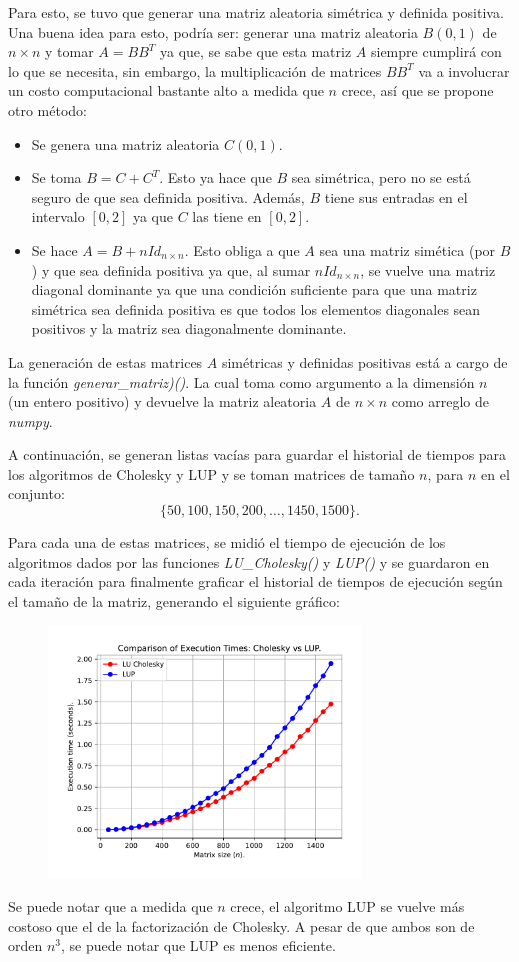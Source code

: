 Para esto, se tuvo que generar una matriz aleatoria simétrica y definida positiva. Una buena idea para esto, podría ser: generar una matriz aleatoria $B(0,1)$ de $n\times n$ y tomar $A = BB^{T}$ ya que, se sabe que esta matriz $A$ siempre cumplirá con lo que se necesita, sin embargo, la multiplicación de matrices $BB^{T}$ va a  involucrar un costo computacional bastante alto a medida que $n$ crece, así que se propone otro método:
\begin{itemize}
	\item Se genera una matriz aleatoria $C(0,1)$.
	\item Se toma $B = C+C^T$. Esto ya hace que $B$ sea simétrica, pero no se está seguro de que sea definida positiva. Además, $B$ tiene sus entradas en el intervalo $[0,2]$ ya que $C$ las tiene en $[0,2]$.
	\item Se hace $A = B + nId_{n\times n}$. Esto obliga a que $A$ sea una matriz simética (por $B$) y que sea definida positiva ya que, al sumar $nId_{n\times n}$, se vuelve una matriz diagonal dominante ya que una condición suficiente para que una matriz simétrica sea definida positiva es que todos los elementos diagonales sean positivos y la matriz sea diagonalmente dominante.
\end{itemize}

La generación de estas matrices $A$ simétricas y definidas positivas está a cargo de la función \textit{generar\_matriz)()}. La cual toma como argumento a la dimensión $n$ (un entero positivo) y devuelve la matriz aleatoria $A$ de $n\times n$ como arreglo de \textit{numpy}.

A continuación, se generan listas vacías para guardar el historial de tiempos para los algoritmos de Cholesky y LUP y se toman matrices de tamaño $n$, para $n$ en el conjunto:
$$\{50,100, 150, 200, \dots, 1450, 1500\}.$$

Para cada una de estas matrices, se midió el tiempo de ejecución de los algoritmos dados por las funciones \textit{LU\_Cholesky()} y \textit{LUP()} y se guardaron en cada iteración para finalmente graficar el historial de tiempos de ejecución según el tamaño de la matriz, generando el siguiente gráfico:

\begin{figure}[h]
	\centering
	\includegraphics[width=0.74\textwidth]{IMAGENES/Figure_1.pdf}
\end{figure}

Se puede notar que a medida que $n$ crece, el algoritmo LUP se vuelve más costoso que el de la factorización de Cholesky. A pesar de que ambos son de orden $n^{3}$, se puede notar que LUP es menos eficiente.










